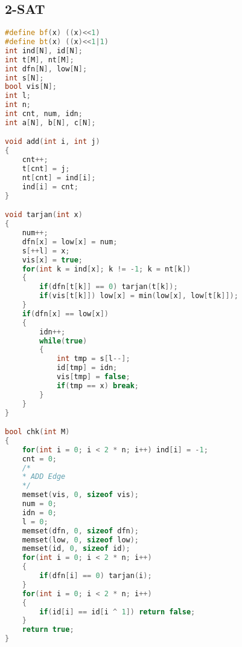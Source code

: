 ﻿\subsection{2-SAT}
    \begin{lstlisting}[language=C++]
#define bf(x) ((x)<<1)
#define bt(x) ((x)<<1|1)
int ind[N], id[N];
int t[M], nt[M];
int dfn[N], low[N];
int s[N];
bool vis[N];
int l;
int n;
int cnt, num, idn;
int a[N], b[N], c[N];

void add(int i, int j)
{
    cnt++;
    t[cnt] = j;
    nt[cnt] = ind[i];
    ind[i] = cnt;
}

void tarjan(int x)
{
    num++;
    dfn[x] = low[x] = num;
    s[++l] = x;
    vis[x] = true;
    for(int k = ind[x]; k != -1; k = nt[k])
    {
        if(dfn[t[k]] == 0) tarjan(t[k]);
        if(vis[t[k]]) low[x] = min(low[x], low[t[k]]);
    }
    if(dfn[x] == low[x])
    {
        idn++;
        while(true)
        {
            int tmp = s[l--];
            id[tmp] = idn;
            vis[tmp] = false;
            if(tmp == x) break;
        }
    }
}

bool chk(int M)
{
    for(int i = 0; i < 2 * n; i++) ind[i] = -1;
    cnt = 0;
	/*
	* ADD Edge
	*/
    memset(vis, 0, sizeof vis);
    num = 0;
    idn = 0;
    l = 0;
    memset(dfn, 0, sizeof dfn);
    memset(low, 0, sizeof low);
    memset(id, 0, sizeof id);
    for(int i = 0; i < 2 * n; i++)
    {
        if(dfn[i] == 0) tarjan(i);
    }
    for(int i = 0; i < 2 * n; i++)
    {
        if(id[i] == id[i ^ 1]) return false;
    }
    return true;
}

    \end{lstlisting}